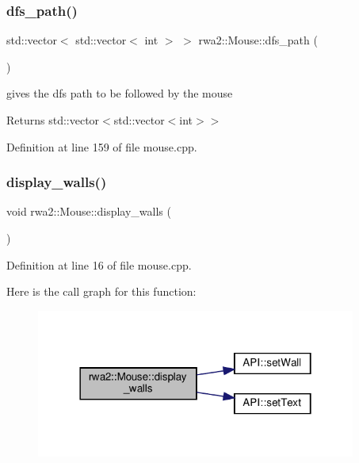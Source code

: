 \subsubsection{\texorpdfstring{dfs\+\_\+path()}{dfs\_path()}}
{\footnotesize\ttfamily std\+::vector$<$ std\+::vector$<$ int $>$ $>$ rwa2\+::\+Mouse\+::dfs\+\_\+path (\begin{DoxyParamCaption}{ }\end{DoxyParamCaption})}



gives the dfs path to be followed by the mouse 

\begin{DoxyReturn}{Returns}
std\+::vector$<$std\+::vector$<$int$>$$>$ 
\end{DoxyReturn}


Definition at line 159 of file mouse.\+cpp.

\mbox{\label{classrwa2_1_1_mouse_abbcc99c41fd073426fdfd790f947956e}} 
\subsubsection{\texorpdfstring{display\+\_\+walls()}{display\_walls()}}
{\footnotesize\ttfamily void rwa2\+::\+Mouse\+::display\+\_\+walls (\begin{DoxyParamCaption}{ }\end{DoxyParamCaption})}



Definition at line 16 of file mouse.\+cpp.

Here is the call graph for this function\+:
\nopagebreak
\begin{figure}[H]
\begin{center}
\leavevmode
\includegraphics[width=298pt]{classrwa2_1_1_mouse_abbcc99c41fd073426fdfd790f947956e_cgraph}
\end{center}
\end{figure}
\mbox{\label{classrwa2_1_1_mouse_a771abb2496a461ab78fa9d18fa8273ed}} 

